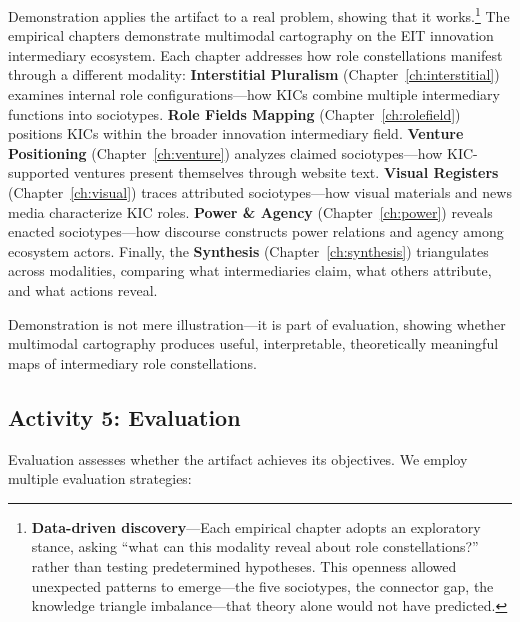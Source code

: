 \documentclass[../main.tex]{subfiles}
\begin{document}
Demonstration applies the artifact to a real problem, showing that it works.\footnote{\textbf{Data-driven discovery}---Each empirical chapter adopts an exploratory stance, asking ``what can this modality reveal about role constellations?'' rather than testing predetermined hypotheses. This openness allowed unexpected patterns to emerge---the five sociotypes, the connector gap, the knowledge triangle imbalance---that theory alone would not have predicted.} The empirical chapters demonstrate multimodal cartography on the EIT innovation intermediary ecosystem. Each chapter addresses how role constellations manifest through a different modality: \textbf{Interstitial Pluralism} (Chapter~\ref{ch:interstitial}) examines internal role configurations---how KICs combine multiple intermediary functions into sociotypes. \textbf{Role Fields Mapping} (Chapter~\ref{ch:rolefield}) positions KICs within the broader innovation intermediary field. \textbf{Venture Positioning} (Chapter~\ref{ch:venture}) analyzes claimed sociotypes---how KIC-supported ventures present themselves through website text. \textbf{Visual Registers} (Chapter~\ref{ch:visual}) traces attributed sociotypes---how visual materials and news media characterize KIC roles. \textbf{Power \& Agency} (Chapter~\ref{ch:power}) reveals enacted sociotypes---how discourse constructs power relations and agency among ecosystem actors. Finally, the \textbf{Synthesis} (Chapter~\ref{ch:synthesis}) triangulates across modalities, comparing what intermediaries claim, what others attribute, and what actions reveal.

Demonstration is not mere illustration---it is part of evaluation, showing whether multimodal cartography produces useful, interpretable, theoretically meaningful maps of intermediary role constellations.

\subsection{Activity 5: Evaluation}

Evaluation assesses whether the artifact achieves its objectives. We employ multiple evaluation strategies:
\end{document}
